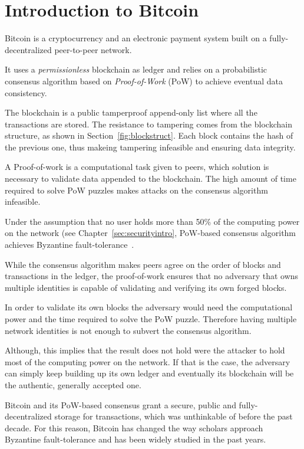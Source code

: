 \chapter{Introduction to Bitcoin}
\label{sec:introbtc}

Bitcoin is a cryptocurrency and an electronic payment system built on a fully-decentralized peer-to-peer network.

It uses a \textit{permissionless} blockchain as ledger and relies on a probabilistic consensus algorithm based on \emph{Proof-of-Work} (PoW) to achieve eventual data consistency.

The blockchain is a public tamperproof append-only list where all the transactions are stored. The resistance to tampering comes from the blockchain structure, as shown in Section~\ref{fig:blockstruct}. Each block contains the hash of the previous one, thus makeing tampering infeasible and ensuring data integrity.

A Proof-of-work is a computational task given to peers, which solution is necessary to validate data appended to the blockchain. The high amount of time required to solve PoW puzzles makes attacks on the consensus algorithm infeasible.\par

Under the assumption that no user holds more than 50\% of the computing power on the network (see Chapter~\ref{sec:securityintro}, PoW-based consensus algorithm achieves Byzantine fault-tolerance~\cite{nakamoto}.

While the consensus algorithm makes peers agree on the order of blocks and transactions in the ledger, the proof-of-work ensures that no adversary that owns multiple identities is capable of validating and verifying its own forged blocks.

In order to validate its own blocks the adversary would need the computational power and the time required to solve the PoW puzzle. Therefore having multiple network identities is not enough to subvert the consensus algorithm. 

Although, this implies that the result does not hold were the attacker to hold most of the computing power on the network. If that is the case, the adversary can simply keep building up its own ledger and eventually its blockchain will be the authentic, generally accepted one.\par

Bitcoin and its PoW-based consensus grant a secure, public and fully-decentralized storage for transactions, which was unthinkable of before the past decade. For this reason, Bitcoin has changed the way scholars approach Byzantine fault-tolerance and has been widely studied in the past years. 

